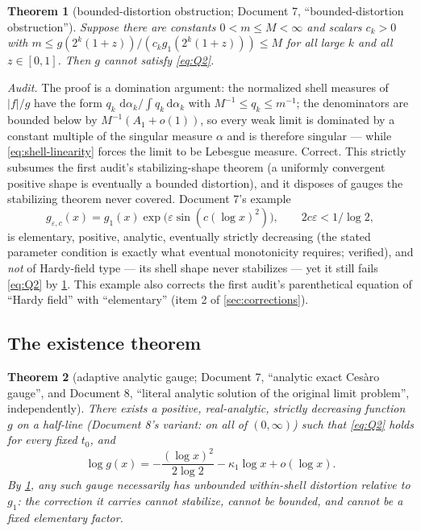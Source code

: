 \documentclass[11pt,oneside]{article}
\newtheorem{theorem}{Theorem}[section]
\theoremstyle{definition}
\theoremstyle{remark}
\newcommand{\dd}{\,\mathrm d}
\begin{document}
\begin{theorem}[bounded-distortion obstruction; Document 7,
``bounded-distortion obstruction'']
\label{thm:bounded-distortion}
Suppose there are constants $0<m\le M<\infty$ and scalars $c_k>0$ with
$m\le g(2^k(1+z))/(c_kg_1(2^k(1+z)))\le M$ for all large $k$ and all
$z\in[0,1]$.  Then $g$ cannot satisfy \eqref{eq:Q2}.
\end{theorem}

\emph{Audit.}  The proof is a domination argument: the normalized shell
measures of $|f|/g$ have the form $q_k\,\dd\alpha_k/\int q_k\dd\alpha_k$
with $M^{-1}\le q_k\le m^{-1}$; the denominators are bounded below by
$M^{-1}(A_1+o(1))$, so every weak limit is dominated by a constant
multiple of the singular measure $\alpha$ and is therefore singular ---
while \eqref{eq:shell-linearity} forces the limit to be Lebesgue
measure.  Correct.  This strictly subsumes the first audit's
stabilizing-shape theorem (a uniformly convergent positive shape is
eventually a bounded distortion), and it disposes of gauges the
stabilizing theorem never covered.  Document 7's example
\[
 g_{\varepsilon,c}(x)=g_1(x)\exp\bigl(\varepsilon\sin(c(\log x)^2)\bigr),
 \qquad 2c\varepsilon<1/\log2,
\]
is elementary, positive, analytic, eventually strictly decreasing
(the stated parameter condition is exactly what eventual monotonicity
requires; verified), and \emph{not} of Hardy-field type --- its shell
shape never stabilizes --- yet it still fails \eqref{eq:Q2} by
\cref{thm:bounded-distortion}.  This example also corrects the first
audit's parenthetical equation of ``Hardy field'' with ``elementary''
(item 2 of \cref{sec:corrections}).

\subsection{The existence theorem}
\label{ssec:existence}

\begin{theorem}[adaptive analytic gauge; Document 7, ``analytic exact
Ces\`aro gauge'', and Document 8, ``literal analytic solution of the
original limit problem'', independently]
\label{thm:adaptive}
There exists a positive, real-analytic, strictly decreasing function
$g$ on a half-line (Document 8's variant: on all of $(0,\infty)$) such
that \eqref{eq:Q2} holds for every fixed $t_0$, and
\[
 \log g(x)=-\frac{(\log x)^2}{2\log2}-\kappa_1\log x+o(\log x).
\]
By \cref{thm:bounded-distortion}, any such gauge necessarily has
\emph{unbounded} within-shell distortion relative to $g_1$: the
correction it carries cannot stabilize, cannot be bounded, and cannot be
a fixed elementary factor.
\end{theorem}
\end{document}
